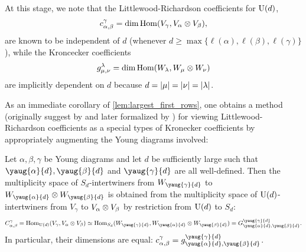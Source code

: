 \documentclass[notitlepage, 10pt]{article}
\begin{document}
At this stage, we note that the Littlewood-Richardson coefficients for $\operatorname{U}(d)$,
\begin{equation}
    c^{\gamma}_{\alpha, \beta} = \dim \operatorname{Hom} (V_{\gamma}, V_{\alpha} \otimes V_{\beta}),
\end{equation}
are known to be independent of $d$ (whenever $d \geq \max\{\ell(\alpha), \ell(\beta), \ell(\gamma) \}$),
while the Kroncecker coefficients
\begin{equation}
    g^{\lambda}_{\mu, \nu} = \dim \operatorname{Hom} (W_{\lambda}, W_{\mu} \otimes W_{\nu})
\end{equation}
are implicitly dependent on $d$ because $d = \left|\mu\right| = \left|\nu\right| = \left|\lambda\right|$.

As an immediate corollary of \cref{lem:largest_first_rows}, one obtains a method (originally suggest by \citeauthor{murnaghan1955analysis} \cite{murnaghan1955analysis} and later formalized by \citeauthor{littlewood1958products} \cite{littlewood1958products}) for viewing Littlewood-Richardson coefficients as a special types of Kronecker coefficients by appropriately augmenting the Young diagrams involved:
\begin{cor}
    Let $\alpha, \beta, \gamma$ be Young diagrams and let $d$ be sufficiently large such that $\yaug{\alpha}{d}, \yaug{\beta}{d}$ and $\yaug{\gamma}{d}$ are all well-defined.
    Then the multiplicity space of $S_d$-intertwiners from $W_{\yaug{\gamma}{d}}$ to $W_{\yaug{\alpha}{d}} \ot W_{\yaug{\beta}{d}}$ is obtained from the multiplicity space of $\operatorname{U}(d)$-intertwiners from $V_{\gamma}$ to $V_{\alpha}\otimes V_{\beta}$ by restriction from $\operatorname{U}(d)$ to $S_d$:
    \begin{equation}
        C^{\gamma}_{\alpha,\beta} = \Hom_{\U(d)}(V_{\gamma}, V_{\alpha}\ot V_{\beta}) \simeq \Hom_{S_d}(W_{\yaug{\gamma}{d}}, W_{\yaug{\alpha}{d}} \ot W_{\yaug{\beta}{d}}) = G^{\yaug{\gamma}{d}}_{\yaug{\alpha}{d}, \yaug{\beta}{d}}.
    \end{equation}
    In particular, their dimensions are equal: $c^{\gamma}_{\alpha, \beta} = g^{\yaug{\gamma}{d}}_{\yaug{\alpha}{d}, \yaug{\beta}{d}}$.
\end{cor}
\end{document}
